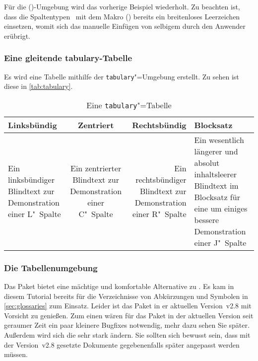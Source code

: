 \documentclass[%
  english,ngerman,%
  cdgeometry=no,DIV=12,automark,%
]{tudscrartcl}
\begin{document}
Für die ()-Umgebung wird das vorherige 
Beispiel wiederholt. Zu beachten ist, dass die Spaltentypen~ mit 
dem Makro () bereits ein breitenloses 
Leerzeichen einsetzen, womit sich das manuelle Einfügen von selbigem durch den 
Anwender erübrigt.
%
\begin{Trunk+}
\subsubsection{Eine gleitende tabulary-Tabelle}
Es wird eine Tabelle mithilfe der \texttt{tabulary}"=Umgebung erstellt. 
Zu sehen ist diese in \autoref{tab:tabulary}. 

\end{Trunk+}
\begin{Trunk}
\begin{table}
\begin{tabulary}{\textwidth}{@{}LCRJ@{}}
\toprule
\textbf{Linksbündig} & \textbf{Zentriert} & 
\textbf{Rechtsbündig} & \textbf{Blocksatz} \tabularnewline
\midrule
Ein linksbündiger Blindtext zur Demonstration einer L"~Spalte &
Ein zentrierter Blindtext zur Demonstration einer C"~Spalte &
Ein rechtsbündiger Blindtext zur Demonstration einer R"~Spalte &
Ein wesentlich längerer und absolut inhaltsleerer Blindtext im 
Blocksatz für eine um einiges bessere Demonstration einer J"~Spalte
\tabularnewline
\bottomrule
\end{tabulary}
\caption{Eine \texttt{tabulary}"=Tabelle}\label{tab:tabulary}
\end{table}

\end{Trunk}
\InputCode


\subsubsection{Die Tabellenumgebung }
\label{sec:tabu}%
%
Das Paket  bietet eine mächtige und komfortable Alternative zu 
. Es kam in diesem Tutorial bereits für die Verzeichnisse von 
Abkürzungen und Symbolen in \autoref{sec:glossaries} zum Einsatz. Leider ist 
das Paket in er aktuellen Version~v2.8 mit Vorsicht zu genießen. Zum einen
wären für das Paket in der aktuellen Version seit geraumer Zeit ein paar 
kleinere Bugfixes notwendig, mehr dazu sehen Sie später. Außerdem wird sich die 
sehr stark ändern. Sie sollten sich bewusst sein, dass mit der Version~v2.8
gesetzte Dokumente gegebenenfalls später angepasst werden müssen.
\end{document}
